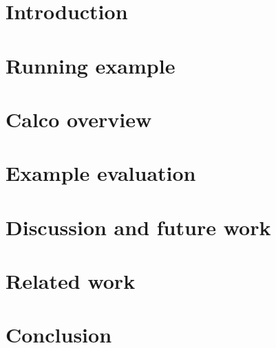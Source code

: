 \documentclass[sigconf]{acmart}
\theoremstyle{remark}
\begin{document}


\maketitle

\thispagestyle{empty}

\section{Introduction}


\section{Running example}


\section{Calco overview}


\section{Example evaluation}


\section{Discussion and future work}


\section{Related work}


\section{Conclusion}




\end{document}
